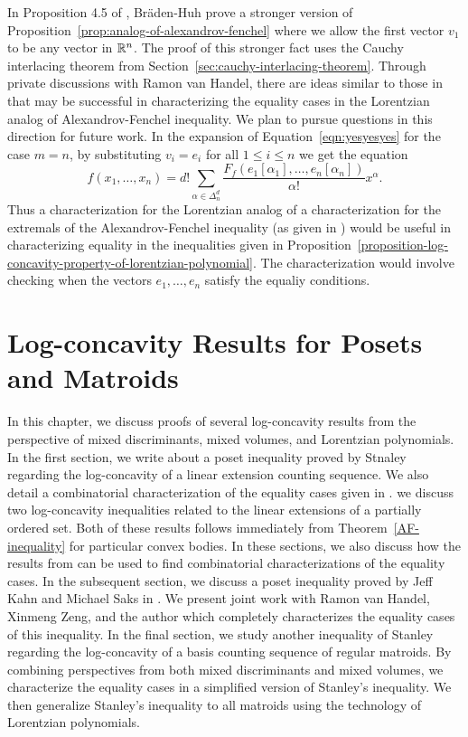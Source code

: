 \documentclass{puthesis-UG}
\begin{document}
\begin{remark}
	In Proposition 4.5 of \cite{lorentzian-polynomials}, Br\"aden-Huh prove a stronger version of Proposition~\ref{prop:analog-of-alexandrov-fenchel} where we allow the first vector $v_1$ to be any vector in $\mathbb{R}^n$. The proof of this stronger fact uses the Cauchy interlacing theorem from Section~\ref{sec:cauchy-interlacing-theorem}. Through private discussions with Ramon van Handel, there are ideas similar to those in \cite{shenfeld2022extremals} that may be successful in characterizing the equality cases in the Lorentzian analog of Alexandrov-Fenchel inequality. We plan to pursue questions in this direction for future work. In the expansion of Equation~\ref{eqn:yesyesyes} for the case $m = n$, by substituting $v_i = e_i$ for all $1 \leq i \leq n$ we get the equation
	\[
		f(x_1, \ldots, x_n) = d! \sum_{\alpha \in \Delta_n^d} \frac{F_f(e_1 [\alpha_1], \ldots, e_n [\alpha_n])}{\alpha!} x^\alpha.
	\]
	Thus a characterization for the Lorentzian analog of a characterization for the extremals of the Alexandrov-Fenchel inequality (as given in \cite{shenfeld2022extremals}) would be useful in characterizing equality in the inequalities given in Proposition~\ref{proposition-log-concavity-property-of-lorentzian-polynomial}. The characterization would involve checking when the vectors $e_1, \ldots, e_n$ satisfy the equaliy conditions. 
\end{remark}

\chapter{Log-concavity Results for Posets and Matroids} \label{log-concavity-results}

In this chapter, we discuss proofs of several log-concavity results from the perspective of mixed discriminants, mixed volumes, and Lorentzian polynomials. In the first section, we write about a poset inequality proved by Stnaley regarding the log-concavity of a linear extension counting sequence. We also detail a combinatorial characterization of the equality cases given in \cite{shenfeld2022extremals}. we discuss two log-concavity inequalities related to the linear extensions of a partially ordered set. Both of these results follows immediately from Theorem~\ref{AF-inequality} for particular convex bodies. In these sections, we also discuss how the results from \cite{shenfeld2022extremals} can be used to find combinatorial characterizations of the equality cases. In the subsequent section, we discuss a poset inequality proved by Jeff Kahn and Michael Saks in \cite{balancing-poset-extensions}. We present joint work with Ramon van Handel, Xinmeng Zeng, and the author which completely characterizes the equality cases of this inequality. In the final section, we study another inequality of Stanley regarding the log-concavity of a basis counting sequence of regular matroids. By combining perspectives from both mixed discriminants and mixed volumes, we characterize the equality cases in a simplified version of Stanley's inequality. We then generalize Stanley's inequality to all matroids using the technology of Lorentzian polynomials. 
\end{document}
